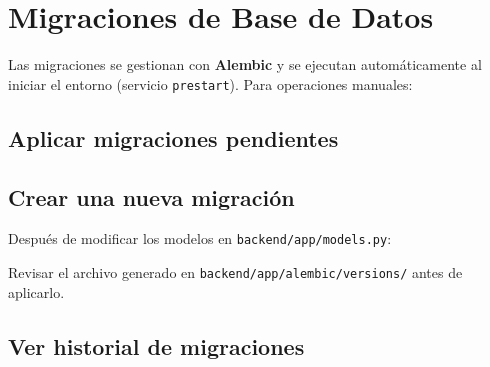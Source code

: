 \section{Migraciones de Base de Datos}\label{migraciones-de-base-de-datos}

Las migraciones se gestionan con \textbf{Alembic} y se ejecutan automáticamente al iniciar el entorno (servicio \texttt{prestart}). Para operaciones manuales:

\subsection{Aplicar migraciones pendientes}\label{aplicar-migraciones-pendientes}

\begin{Shaded}
\begin{Highlighting}[]
\end{Highlighting}
\end{Shaded}

\subsection{Crear una nueva migración}\label{crear-una-nueva-migraciuxf3n}

Después de modificar los modelos en \texttt{backend/app/models.py}:

\begin{Shaded}
\begin{Highlighting}[]
  
\end{Highlighting}
\end{Shaded}

Revisar el archivo generado en \texttt{backend/app/alembic/versions/} antes de aplicarlo.

\subsection{Ver historial de migraciones}\label{ver-historial-de-migraciones}

\begin{Shaded}
\begin{Highlighting}[]
\end{Highlighting}
\end{Shaded}

